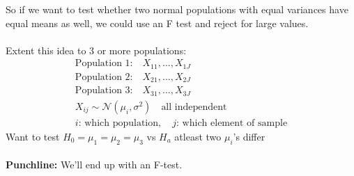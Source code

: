 So if we want to test whether two normal populations with equal variances have equal means as well, we could use an F test and reject for large values. \\\\
Extent this idea to 3 or more populations:
\begin{gather*}
	\text{Population 1:} \quad X_{11}, \ldots, X_{1J}\\
	\text{Population 2:} \quad X_{21}, \ldots, X_{2J}\\
	\text{Population 3:} \quad X_{31}, \ldots, X_{3J}\\
	X_{ij} \sim \mathcal{N}(\mu_i, \sigma^2) \quad \text{all independent}\\
	i \text{: which population}, \quad j \text{: which element of sample}
\end{gather*}
Want to test $H_0 = \mu_1 = \mu_2 = \mu_3$ vs $H_a$ atleast two $\mu_i$'s differ\\\\
\textbf{Punchline:} We'll end up with an F-test.